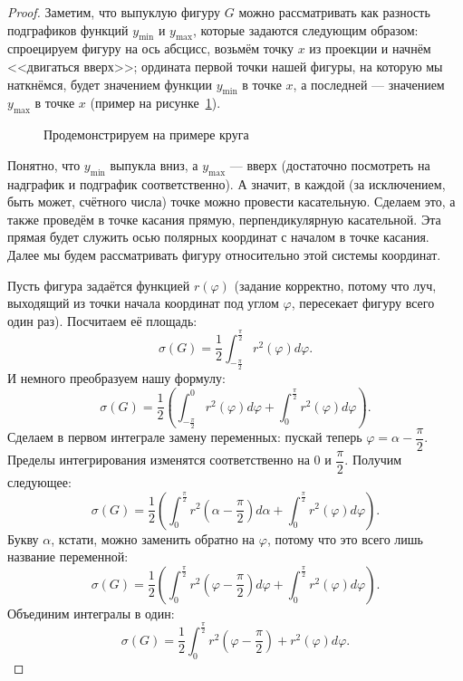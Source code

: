 \begin{proof}
	Заметим, что выпуклую фигуру \(G\) можно рассматривать как разность подграфиков функций \(y_{\min}\) и \(y_{\max}\),  которые задаются следующим образом: спроецируем фигуру на ось абсцисс, возьмём точку \(x\) из проекции и начнём <<двигаться вверх>>; ордината первой точки нашей фигуры, на которую мы наткнёмся, будет значением функции \(y_{\min}\) в точке \(x\), а последней --- значением  \(y_{\max}\) в точке \(x\) (пример на рисунке~\ref{kroog}).
	\begin{figure}
		\caption{Продемонстрируем на примере круга}
		\label{kroog}
	\end{figure}
	
	Понятно, что \(y_{\min}\) выпукла вниз, а \(y_{\max}\) --- вверх (достаточно посмотреть на надграфик и подграфик соответственно). А значит, в каждой (за исключением, быть может, счётного числа) точке можно провести касательную. Сделаем это, а также проведём в точке касания прямую, перпендикулярную касательной. Эта прямая будет служить осью полярных координат с началом в точке касания. Далее мы будем рассматривать фигуру относительно этой системы координат.
	
	Пусть фигура задаётся функцией \(r(\varphi)\) (задание корректно, потому что луч, выходящий из точки начала координат под углом \(\varphi\), пересекает фигуру всего один раз). Посчитаем её площадь: \[
	\sigma(G) = \frac{1}{2} \int_{-\frac{\pi}{2}}^{\frac{\pi}{2}} r^2(\varphi) d\varphi.
	\]
	И немного преобразуем нашу формулу: \[
	\sigma(G) = \frac{1}{2} \left(\int_{-\frac{\pi}{2}}^{0} r^2(\varphi) d\varphi + \int_{0}^{\frac{\pi}{2}} r^2(\varphi) d\varphi \right).
	\]
	Сделаем в первом интеграле замену переменных: пускай теперь \(\varphi = \alpha - \dfrac{\pi}{2}\). Пределы интегрирования изменятся соответственно на \(0\) и \(\dfrac{\pi}{2}\). Получим следующее: \[
	\sigma(G) = \frac{1}{2} \left(\int_{0}^{\frac{\pi}{2}} r^2 \left(\alpha - \frac{\pi}{2} \right) d\alpha + \int_{0}^{\frac{\pi}{2}} r^2(\varphi) d\varphi \right).
	\]
	Букву \(\alpha\), кстати, можно заменить обратно на \(\varphi\), потому что это всего лишь название переменной: \[
	\sigma(G) = \frac{1}{2} \left(\int_{0}^{\frac{\pi}{2}} r^2 \left(\varphi - \frac{\pi}{2} \right) d\varphi + \int_{0}^{\frac{\pi}{2}} r^2(\varphi) d\varphi \right).
	\]
	Объединим интегралы в один: \[
	\sigma(G) = \frac{1}{2} \int_{0}^{\frac{\pi}{2}} r^2 \left(\varphi - \frac{\pi}{2} \right) +  r^2(\varphi) d\varphi.
	\]
	

\end{proof}
